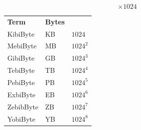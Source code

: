 \hfill
\begin{minipage}[t]{0.3\textwidth}
    \[\times 1024\]
    \begin{center}
        \begin{tabular}{l l l}
            \textbf{Term} & \textbf{Bytes}            \\
            KibiByte      & KB             & $1024$   \\
            MebiByte      & MB             & $1024^2$ \\
            GibiByte      & GB             & $1024^3$ \\
            TebiByte      & TB             & $1024^4$ \\
            PebiByte      & PB             & $1024^5$ \\
            ExbiByte      & EB             & $1024^6$ \\
            ZebibByte     & ZB             & $1024^7$ \\
            YobiByte      & YB             & $1024^8$ \\
        \end{tabular}
    \end{center}
\end{minipage}

